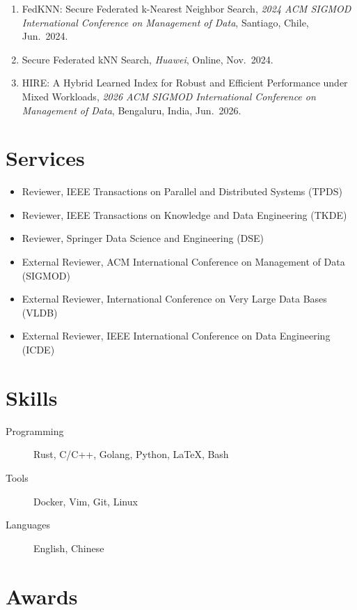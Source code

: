 \documentclass{mycv}
\begin{document}
\begin{enumerate}
  \item FedKNN: Secure Federated k-Nearest Neighbor Search, \emph{2024 ACM SIGMOD International Conference on Management of Data}, Santiago, Chile, Jun.~2024.
  
  \item Secure Federated kNN Search, \emph{Huawei}, Online, Nov.~2024.

  \item HIRE: A Hybrid Learned Index for Robust and Efficient Performance under Mixed Workloads, \emph{2026 ACM SIGMOD International Conference on Management of Data}, Bengaluru, India, Jun.~2026.
\end{enumerate}

\section{Services}
\begin{itemize}
    \item Reviewer, IEEE Transactions on Parallel and Distributed Systems (TPDS) 
    \item Reviewer, IEEE Transactions on Knowledge and Data Engineering (TKDE) 
    \item Reviewer, Springer Data Science and Engineering (DSE) 
    \item External Reviewer, ACM International Conference on Management of Data (SIGMOD) 
    \item External Reviewer, International Conference on Very Large Data Bases (VLDB) 
    \item External Reviewer, IEEE International Conference on Data Engineering (ICDE) 
\end{itemize}

\section{Skills}

\begin{description}
  \item[Programming] Rust, C/C++, Golang, Python, \LaTeX, Bash
  \item[Tools] Docker, Vim, Git, Linux
  \item[Languages] English, Chinese
\end{description}

\section{Awards}
\end{document}
